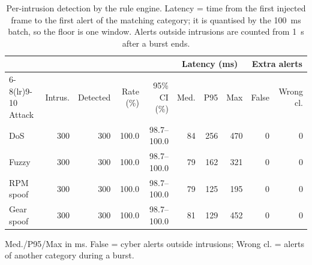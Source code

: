 \begin{table}[t]
\centering
\footnotesize
\caption{Per-intrusion detection by the rule engine. Latency = time from the first injected frame to the first alert of the matching category; it is quantised by the 100~ms batch, so the floor is one window. Alerts outside intrusions are counted from 1~s after a burst ends.}
\label{tab:hcrl_rules_latency}
\begin{tabular}{lrrrrrrrrr}
\toprule
& & & & & \multicolumn{3}{c}{Latency (ms)} & \multicolumn{2}{c}{Extra alerts} \\
\cmidrule(lr){6-8}\cmidrule(lr){9-10}
Attack & Intrus. & Detected & Rate (\%) & 95\% CI (\%) & Med. & P95 & Max & False & Wrong cl. \\
\midrule
DoS & 300 & 300 & 100.0 & 98.7--100.0 & 84 & 256 & 470 & 0 & 0 \\
Fuzzy & 300 & 300 & 100.0 & 98.7--100.0 & 79 & 162 & 321 & 0 & 0 \\
RPM spoof & 300 & 300 & 100.0 & 98.7--100.0 & 79 & 125 & 195 & 0 & 0 \\
Gear spoof & 300 & 300 & 100.0 & 98.7--100.0 & 81 & 129 & 452 & 0 & 0 \\
\bottomrule
\end{tabular}
\par\smallskip\parbox{0.95\linewidth}{\footnotesize Med./P95/Max in ms. False = cyber alerts outside intrusions; Wrong cl. = alerts of another category during a burst.}
\end{table}
